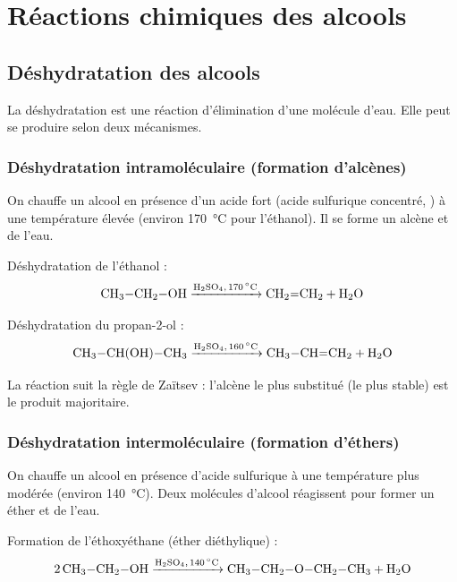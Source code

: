 \section{Réactions chimiques des alcools}

\subsection{Déshydratation des alcools}

La déshydratation est une réaction d'élimination d'une molécule d'eau. Elle peut se produire selon deux mécanismes.

\subsubsection{Déshydratation intramoléculaire (formation d'alcènes)}

\begin{experience}
On chauffe un alcool en présence d'un acide fort (acide sulfurique concentré, ) à une température élevée (environ \SI{170}{\celsius} pour l'éthanol). Il se forme un alcène et de l'eau.
\end{experience}

\begin{exemple}
Déshydratation de l'éthanol :
\[\ce{CH3-CH2-OH ->[H2SO4, \SI{170}{\celsius}] CH2=CH2 + H2O}\]

Déshydratation du propan-2-ol :
\[\ce{CH3-CH(OH)-CH3 ->[H2SO4, \SI{160}{\celsius}] CH3-CH=CH2 + H2O}\]
\end{exemple}

\begin{remarque}
La réaction suit la règle de Zaïtsev : l'alcène le plus substitué (le plus stable) est le produit majoritaire.
\end{remarque}

\subsubsection{Déshydratation intermoléculaire (formation d'éthers)}

\begin{experience}
On chauffe un alcool en présence d'acide sulfurique à une température plus modérée (environ \SI{140}{\celsius}). Deux molécules d'alcool réagissent pour former un éther et de l'eau.
\end{experience}

\begin{exemple}
Formation de l'éthoxyéthane (éther diéthylique) :
\[\ce{2 CH3-CH2-OH ->[H2SO4, \SI{140}{\celsius}] CH3-CH2-O-CH2-CH3 + H2O}\]
\end{exemple}

